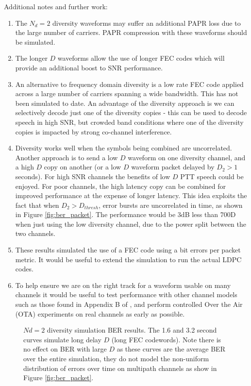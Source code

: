 \documentclass{article}
\begin{document}
Additional notes and further work:
\begin{enumerate}
\item The $N_d=2$ diversity waveforms may suffer an additional PAPR loss due to the large number of carriers. PAPR compression with these waveforms should be simulated.
\item The longer $D$ waveforms allow the use of longer FEC codes which will provide an additional boost to SNR performance.
\item An alternative to frequency domain diversity is a low rate FEC code applied across a large number of carriers spanning a wide bandwidth.  This has not been simulated to date.  An advantage of the diversity approach is we can selectively decode just one of the diversity copies - this can be used to decode speech in high SNR, but crowded band conditions where one of the diversity copies is impacted by strong co-channel interference. 
\item Diversity works well when the symbols being combined are uncorrelated.  Another approach is to send a low $D$ waveform on one diversity channel, and a high $D$ copy on another (or a low $D$ waveform packet delayed by $D_2>1$ seconds).  For high SNR channels the benefits of low $D$ PTT speech could be enjoyed.  For poor channels, the high latency copy can be combined for improved performance at the expense of longer latency. This idea exploits the fact that when $D_2>D_{thresh}$, error bursts are uncorrelated in time, as shown in Figure \ref{fig:ber_packet}.  The performance would be 3dB less than 700D when just using the low diversity channel, due to the power split between the two channels.
\item These results simulated the use of a FEC code using a bit errors per packet metric.  It would be useful to extend the simulation to run the actual LDPC codes.
\item To help ensure we are on the right track for a waveform usable on many channels it would be useful to test performance with other channel models such as those found in Appendix B of \cite{etsi201}, and perform controlled Over the Air (OTA) experiments on real channels as early as possible.
\end{enumerate}

\begin{figure}[H]
\caption{$Nd=2$ diversity simulation BER results. The 1.6 and 3.2 second curves simulate long delay $D$ (long FEC codewords). Note there is no effect on BER with large $D$ as these curves are the average BER over the entire simulation, they do not model the non-uniform distribution of errors over time on multipath channels as show in Figure \ref{fig:ber_packet}.}
\label{fig:div_ber_curves}
\begin{center}

\end{center}
\end{figure}
\end{document}

